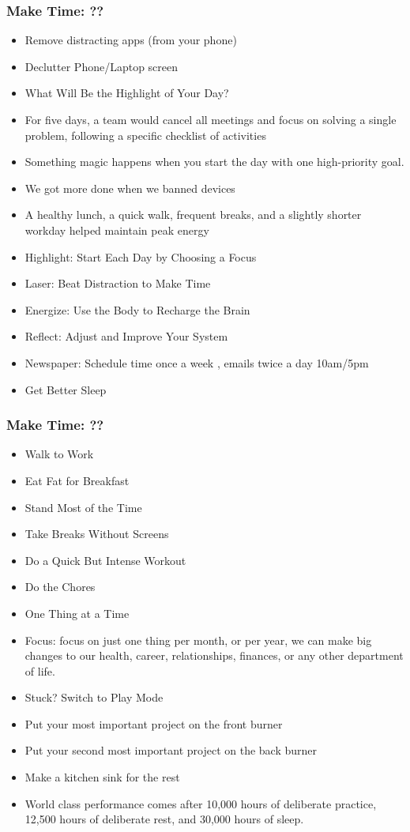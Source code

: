 \begin{frame}[fragile]\frametitle{Make Time: ??}
	\begin{itemize}
	\item Remove distracting apps (from your phone)
	\item Declutter Phone/Laptop screen
	\item What Will Be the Highlight of Your Day?
	\item For five days, a team would cancel all meetings and focus on solving a single problem, following a specific checklist of activities
	\item Something magic happens when you start the day with one high-priority goal.
	\item We got more done when we banned devices
	\item A healthy lunch, a quick walk, frequent breaks, and a slightly shorter workday helped maintain peak energy
	\item Highlight: Start Each Day by Choosing a Focus
	\item Laser: Beat Distraction to Make Time
	\item Energize: Use the Body to Recharge the Brain
	\item Reflect: Adjust and Improve Your System
	\item Newspaper: Schedule time once a week , emails twice a day 10am/5pm
	\item Get Better Sleep
	\end{itemize}

\end{frame}

\begin{frame}[fragile]\frametitle{Make Time: ??}
	\begin{itemize}
	\item Walk to Work
	\item Eat Fat for Breakfast
	\item Stand Most of the Time
	\item Take Breaks Without Screens
	\item Do a Quick But Intense Workout
	\item Do the Chores
	\item One Thing at a Time
	\item Focus: focus on just one thing per month, or per year, we can make big changes to our health, career, relationships, finances, or any other department of life.
	\item Stuck? Switch to Play Mode
	\item Put your most important project on the front burner
	\item Put your second most important project on the back burner
	\item Make a kitchen sink for the rest
	\item World class performance comes after 10,000 hours of deliberate practice, 12,500 hours of deliberate rest, and 30,000 hours of sleep.
	\end{itemize}

\end{frame}

